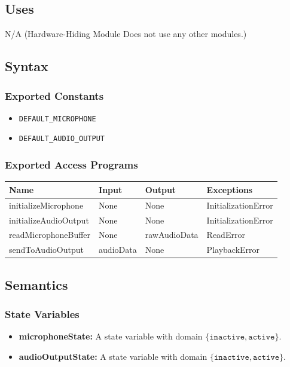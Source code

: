 \documentclass[12pt, titlepage]{article}
\begin{document}
\subsection{Uses}  
N/A (Hardware-Hiding Module Does not use any other modules.)

\subsection{Syntax}  

\subsubsection{Exported Constants}  
\begin{itemize}
    \item \texttt{DEFAULT\_MICROPHONE}  
    \item \texttt{DEFAULT\_AUDIO\_OUTPUT}  
\end{itemize}  

\subsubsection{Exported Access Programs}  
\begin{center}  
\begin{tabular}{|p{5cm}|p{2cm}|p{4cm}|p{3.5cm}|}  
\hline  
\textbf{Name} & \textbf{Input} & \textbf{Output} & \textbf{Exceptions} \\  
\hline  
initializeMicrophone & None & None & InitializationError \\  
initializeAudioOutput & None & None & InitializationError \\  
readMicrophoneBuffer & None & rawAudioData & ReadError \\  
sendToAudioOutput & audioData & None & PlaybackError \\  
\hline  
\end{tabular}  
\end{center}  

\subsection{Semantics}  

\subsubsection{State Variables}
\begin{itemize}
    \item \textbf{microphoneState:} A state variable with domain $\{\texttt{inactive}, \texttt{active}\}$.
    \item \textbf{audioOutputState:} A state variable with domain $\{\texttt{inactive}, \texttt{active}\}$.
\end{itemize}
\end{document}
